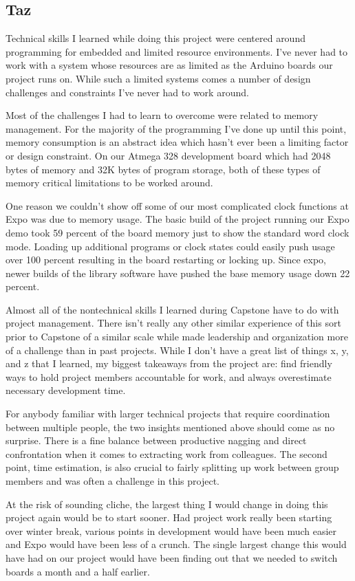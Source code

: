 \documentclass[onecolumn, draftclsnofoot,10pt, compsoc]{IEEEtran}
\begin{document}
\subsection{Taz}
Technical skills I learned while doing this project were centered around programming for embedded and limited resource environments.
I’ve never had to work with a system whose resources are as limited as the Arduino boards our project runs on.
While such a limited systems comes a number of design challenges and constraints I’ve never had to work around.
 
Most of the challenges I had to learn to overcome were related to memory management.
For the majority of the programming I’ve done up until this point, memory consumption is an abstract idea which hasn’t ever been a limiting factor or design constraint.
On our Atmega 328 development board which had 2048 bytes of memory and 32K bytes of program storage, both of these types of memory critical limitations to be worked around.
 
One reason we couldn’t show off some of our most complicated clock functions at Expo was due to memory usage.
The basic build of the project running our Expo demo took 59 percent of the board memory just to show the standard word clock mode.
Loading up additional programs or clock states could easily push usage over 100 percent resulting in the board restarting or locking up.
Since expo, newer builds of the library software have pushed the base memory usage down 22 percent.
 
Almost all of the nontechnical skills I learned during Capstone have to do with project management. There isn’t really any other similar experience of this sort prior to Capstone of a similar scale while made leadership and organization more of a challenge than in past projects.
While I don’t have a great list of things x, y, and z that I learned, my biggest takeaways from the project are: find friendly ways to hold project members accountable for work, and always overestimate necessary development time.
 
For anybody familiar with larger technical projects that require coordination between multiple people, the two insights mentioned above should come as no surprise.
There is a fine balance between productive nagging and direct confrontation when it comes to extracting work from colleagues.
The second point, time estimation, is also crucial to fairly splitting up work between group members and was often a challenge in this project.
 
At the risk of sounding cliche, the largest thing I would change in doing this project again would be to start sooner.
Had project work really been starting over winter break, various points in development would have been much easier and Expo would have been less of a crunch.
The single largest change this would have had on our project would have been finding out that we needed to switch boards a month and a half earlier.
\end{document}

